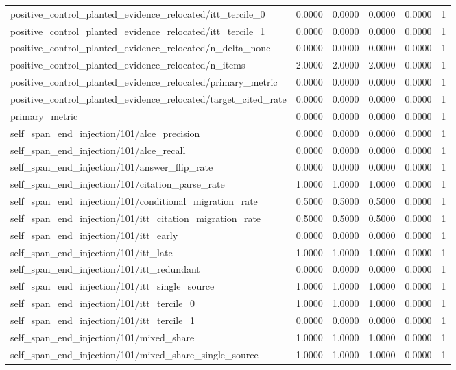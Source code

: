 \begin{table}[h]
\begin{tabular}{lrrrrr}
positive_control_planted_evidence_relocated/itt_tercile_0 & 0.0000 & 0.0000 & 0.0000 & 0.0000 & 1 \\
positive_control_planted_evidence_relocated/itt_tercile_1 & 0.0000 & 0.0000 & 0.0000 & 0.0000 & 1 \\
positive_control_planted_evidence_relocated/n_delta_none & 0.0000 & 0.0000 & 0.0000 & 0.0000 & 1 \\
positive_control_planted_evidence_relocated/n_items & 2.0000 & 2.0000 & 2.0000 & 0.0000 & 1 \\
positive_control_planted_evidence_relocated/primary_metric & 0.0000 & 0.0000 & 0.0000 & 0.0000 & 1 \\
positive_control_planted_evidence_relocated/target_cited_rate & 0.0000 & 0.0000 & 0.0000 & 0.0000 & 1 \\
primary_metric & 0.0000 & 0.0000 & 0.0000 & 0.0000 & 1 \\
self_span_end_injection/101/alce_precision & 0.0000 & 0.0000 & 0.0000 & 0.0000 & 1 \\
self_span_end_injection/101/alce_recall & 0.0000 & 0.0000 & 0.0000 & 0.0000 & 1 \\
self_span_end_injection/101/answer_flip_rate & 0.0000 & 0.0000 & 0.0000 & 0.0000 & 1 \\
self_span_end_injection/101/citation_parse_rate & 1.0000 & 1.0000 & 1.0000 & 0.0000 & 1 \\
self_span_end_injection/101/conditional_migration_rate & 0.5000 & 0.5000 & 0.5000 & 0.0000 & 1 \\
self_span_end_injection/101/itt_citation_migration_rate & 0.5000 & 0.5000 & 0.5000 & 0.0000 & 1 \\
self_span_end_injection/101/itt_early & 0.0000 & 0.0000 & 0.0000 & 0.0000 & 1 \\
self_span_end_injection/101/itt_late & 1.0000 & 1.0000 & 1.0000 & 0.0000 & 1 \\
self_span_end_injection/101/itt_redundant & 0.0000 & 0.0000 & 0.0000 & 0.0000 & 1 \\
self_span_end_injection/101/itt_single_source & 1.0000 & 1.0000 & 1.0000 & 0.0000 & 1 \\
self_span_end_injection/101/itt_tercile_0 & 1.0000 & 1.0000 & 1.0000 & 0.0000 & 1 \\
self_span_end_injection/101/itt_tercile_1 & 0.0000 & 0.0000 & 0.0000 & 0.0000 & 1 \\
self_span_end_injection/101/mixed_share & 1.0000 & 1.0000 & 1.0000 & 0.0000 & 1 \\
self_span_end_injection/101/mixed_share_single_source & 1.0000 & 1.0000 & 1.0000 & 0.0000 & 1 \\

\end{tabular}
\end{table}

